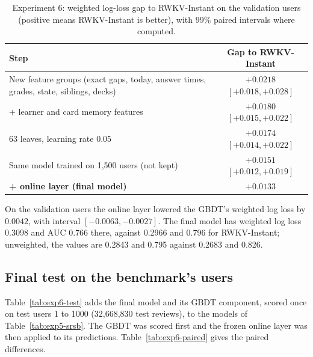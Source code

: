 \begin{table}[htbp]
  \centering
  \caption[Experiment 6: development steps]{Experiment 6: weighted log-loss gap to RWKV-Instant on the validation users
    (positive means RWKV-Instant is better), with 99\% paired intervals where computed.}
  \label{tab:exp6-dev}
  \begin{tabular}{@{}lc@{}}
    \toprule
    Step & Gap to RWKV-Instant \\
    \midrule
    New feature groups (exact gaps, today, answer times, grades, state, siblings, decks) & $+0.0218$ $[+0.018, +0.028]$ \\
    + learner and card memory features & $+0.0180$ $[+0.015, +0.022]$ \\
    63 leaves, learning rate 0.05 & $+0.0174$ $[+0.014, +0.022]$ \\
    Same model trained on 1,500 users (not kept) & $+0.0151$ $[+0.012, +0.019]$ \\
    \textbf{+ online layer (final model)} & $\mathbf{+0.0133}$ \\
    \bottomrule
  \end{tabular}
\end{table}

On the validation users the online layer lowered the GBDT's weighted log loss by $0.0042$, with interval $[-0.0063, -0.0027]$.
The final model has weighted log loss 0.3098 and AUC 0.766 there, against 0.2966 and 0.796 for RWKV-Instant; unweighted, the
values are 0.2843 and 0.795 against 0.2683 and 0.826.

\subsection{Final test on the benchmark's users}
\label{sec:results-exp6-test}

Table~\ref{tab:exp6-test} adds the final model and its GBDT component, scored once on test users 1 to 1000 (32,668,830 test reviews), to the
models of Table~\ref{tab:exp5-srsb}. The GBDT was scored first and the frozen online layer was then applied to its predictions. Table~\ref{tab:exp6-paired} gives the paired differences.

